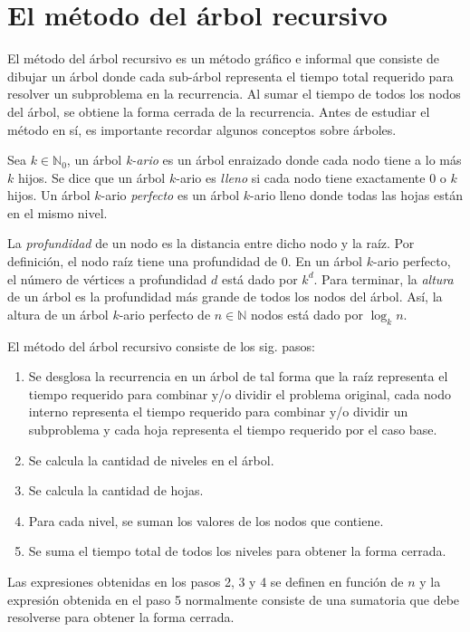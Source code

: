 \section{El método del árbol recursivo}

El método del árbol recursivo es un método gráfico e informal que
consiste de dibujar un árbol donde cada sub-árbol representa el
tiempo total requerido para resolver un subproblema en la recurrencia. Al
sumar el tiempo de todos los nodos del árbol, se obtiene la forma
cerrada de la recurrencia. Antes de estudiar el método en sí, es 
importante recordar algunos conceptos sobre árboles. 

Sea $k\in\mathbb{N}_0$, un árbol \textit{k-ario} es un árbol 
enraizado donde cada nodo tiene a lo más $k$ hijos. Se dice que un
árbol $k$-ario es \textit{lleno} si cada nodo
tiene exactamente 0 o $k$ hijos. Un árbol $k$-ario 
\textit{perfecto} es un árbol $k$-ario lleno donde todas las hojas 
están en el mismo nivel. 

La \textit{profundidad} de un nodo es la distancia entre dicho nodo 
y la raíz. Por definición, el nodo raíz tiene una profundidad de 0. 
En un árbol $k$-ario perfecto, el número de vértices a 
profundidad $d$ está dado por $k^d$. Para terminar, la \textit{altura} 
de un árbol es la profundidad más grande de todos los nodos del árbol. 
Así, la altura de un árbol $k$-ario perfecto de $n\in\mathbb{N}$ 
nodos está dado por $\log_k{n}$.

El método del árbol recursivo consiste de los sig. pasos:

\begin{enumerate}
    \item Se desglosa la recurrencia en un árbol de tal forma que la raíz representa
    el tiempo requerido para combinar y/o dividir el problema original,
    cada nodo interno representa el tiempo requerido para combinar y/o
    dividir un subproblema y cada hoja representa el tiempo requerido
    por el caso base. 
    \item Se calcula la cantidad de niveles en el árbol.
    \item Se calcula la cantidad de hojas.
    \item Para cada nivel, se suman los valores de los nodos que contiene.
    \item Se suma el tiempo total de todos los niveles para obtener la
    forma cerrada.
\end{enumerate}
Las expresiones obtenidas en los pasos 2, 3 y 4 
se definen en función de $n$ y la expresión obtenida en el paso 5 normalmente consiste de 
una sumatoria que debe resolverse para obtener la forma cerrada.

